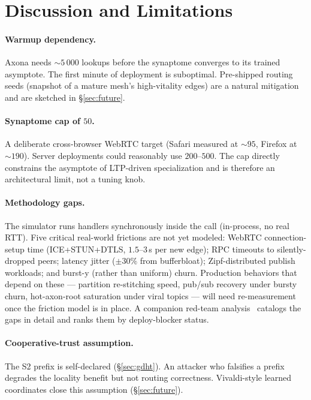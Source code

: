\documentclass[conference]{IEEEtran}
\newcommand{\axona}{Axona\xspace}
\begin{document}
\section{Discussion and Limitations}
\label{sec:discussion}

\paragraph{Warmup dependency.}
\axona needs $\sim\!5\,000$ lookups before the synaptome
converges to its trained asymptote.  The first minute of
deployment is suboptimal.  Pre-shipped routing seeds (snapshot
of a mature mesh's high-vitality edges) are a natural mitigation
and are sketched in \S\ref{sec:future}.

\paragraph{Synaptome cap of $50$.}
A deliberate cross-browser WebRTC target (Safari measured at
$\sim\!95$, Firefox at $\sim\!190$).  Server deployments could
reasonably use $200$--$500$.  The cap directly constrains the
asymptote of LTP-driven specialization and is therefore an
architectural limit, not a tuning knob.

\paragraph{Methodology gaps.}
The simulator runs handlers synchronously inside the call
(in-process, no real RTT).  Five critical real-world frictions
are not yet modeled: WebRTC connection-setup time
(ICE+STUN+DTLS, $1.5$--$3$\,s per new edge); RPC timeouts to
silently-dropped peers; latency jitter ($\pm 30\%$ from
bufferbloat); Zipf-distributed publish workloads; and burst-y
(rather than uniform) churn.  Production behaviors that
depend on these --- partition re-stitching speed, pub/sub
recovery under bursty churn, hot-axon-root saturation under
viral topics --- will need re-measurement once the friction
model is in place.  A companion red-team
analysis~\cite{nh1redteam2026} catalogs the gaps in detail
and ranks them by deploy-blocker status.

\paragraph{Cooperative-trust assumption.}
The S2 prefix is self-declared (\S\ref{sec:gdht}).  An attacker
who falsifies a prefix degrades the locality benefit but not
routing correctness.  Vivaldi-style learned coordinates close
this assumption (\S\ref{sec:future}).
\end{document}
